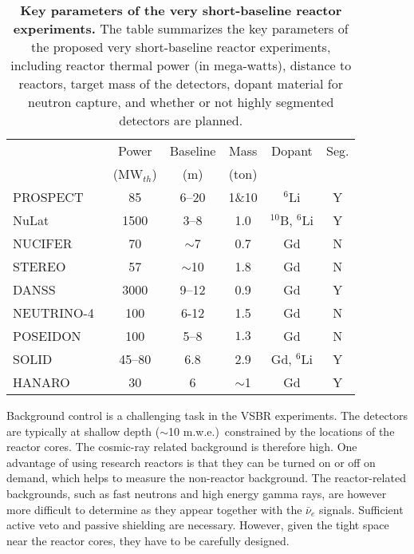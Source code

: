 \documentclass[aps,twocolumn,preprintnumbers,amsmath,superscriptaddress,amssymb,floats,nofootinbib]{revtex4-1}
\begin{document}
\begin{table}[tb]
  \begin{tabular}{lccccc}
  \hline
  & Power & Baseline & Mass & Dopant & Seg. \\
  & (MW$_{th}$) & (m) & (ton) &    & \\
  \hline
  PROSPECT~\cite{PROSPECT}  & 85  & 6--20 & 1\&10  & $^6$Li & Y \\
  NuLat~\cite{NuLat}  & 1500  & 3--8 & 1.0  & $^{10}$B, $^6$Li & Y \\
  NUCIFER~\cite{NUCIFER-2010}   & 70 & $\sim$7  & 0.7 & Gd & N \\
  STEREO~\cite{sterileWP} & 57  & $\sim$10 & 1.8  & Gd & N \\
  DANSS~\cite{DANSS} & 3000  & 9--12  & 0.9  & Gd & Y \\
  NEUTRINO-4~\cite{NEUTRINO4-2012} & 100  & 6-12  & 1.5  & Gd & N \\
  POSEIDON~\cite{POSEIDON} & 100  & 5--8  & $1.3$ & Gd & N \\
  SOLID~\cite{Lasserre-Neutrino14} & 45--80 & 6.8  & 2.9  & Gd, $^6$Li & Y \\
  HANARO~\cite{HANARO} & 30  & 6  & $\sim$1  & Gd & Y \\
  \hline
  \end{tabular}
  \caption{{\bf Key parameters of the very short-baseline reactor experiments.} The table summarizes the key parameters of the proposed very short-baseline reactor experiments, including reactor thermal power (in mega-watts), distance to reactors, target mass of the detectors, dopant material for neutron capture, and whether or not highly segmented detectors are planned.}
\label{tab:sterile}
\end{table}

Background control is a challenging task in the VSBR experiments.
The detectors are typically at shallow depth ($\sim$10 m.w.e.)\ constrained by the locations of the reactor cores.
The cosmic-ray related background is therefore high.
One advantage of using research reactors is that they can be turned on or off on demand, which helps to measure the non-reactor background.
The reactor-related backgrounds, such as fast neutrons and high energy gamma rays, are however more difficult to determine
as they appear together with the $\bar\nu_e$ signals.
Sufficient active veto and passive shielding are necessary. However, given the tight space near the reactor cores,  they have to be carefully designed.
\end{document}
